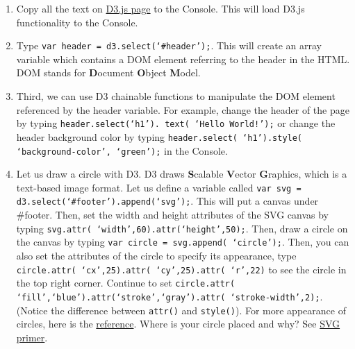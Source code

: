 \documentclass[a4paper, 11pt]{article}
\begin{document}
\begin{enumerate}
\item Copy all the text on \href{https://raw.githubusercontent.com/mbostock/d3/master/d3.min.js}{D3.js page} to the Console. This will load D3.js functionality to the Console. 
\item Type \texttt{\color{red}var header = d3.select(`\#{header}');}. This will create an array variable which contains a DOM element referring to the header in the HTML. DOM stands for {\bf D}ocument {\bf O}bject {\bf M}odel.
\item Third, we can use D3 chainable functions to manipulate the DOM element referenced by the header variable. For example, change the header of the page by typing \texttt{\color{red}header.select(`h1'). text( `Hello World!');} or change the header background color by typing \texttt{\color{red}header.select( `h1').style( `background-color', `green');} in the Console.
\item Let us draw a circle with D3. D3 draws {\bf S}calable {\bf V}ector {\bf G}raphics, which is a text-based image format. Let us define a variable called \texttt{\color{red}var svg = d3.select(`\#{footer}').append(`svg');}. This will put a canvas under \#{footer. }Then, set the width and height attributes of the SVG canvas by typing {\color{red}\tt svg.attr( `width',60).attr(`height',50);}. Then, draw a circle on the canvas by typing \texttt{\color{red}var circle = svg.append( `circle');}. Then, you can also set the attributes of the circle to specify its appearance, type \texttt{\color{red}circle.attr( `cx',25).attr( `cy',25).attr( `r',22)} to see the circle in the top right corner. Continue to set \texttt{\color{red}circle.attr( `fill',`blue').attr(`stroke',`gray').attr( `stroke-width',2);}. (Notice the difference between \texttt{attr()} and \texttt{style()}). For more appearance of circles, here is the \href{http://alignedleft.com/tutorials/d3/an-svg-primer}{reference}. Where is your circle placed and why? See \href{http://alignedleft.com/tutorials/d3/an-svg-primer}{SVG primer}.


\end{enumerate}
\end{document}
